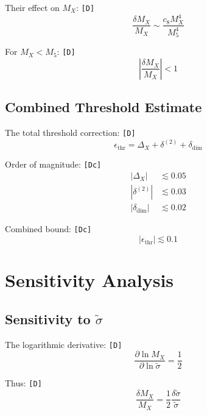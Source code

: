\documentclass[11pt,a4paper]{article}
\newcommand{\tagD}{\textcolor{green!50!black}{\texttt{[D]}}}
\newcommand{\tagDc}{\textcolor{blue!70!black}{\texttt{[Dc]}}}
\theoremstyle{definition}
\begin{document}
Their effect on $M_X$: \tagD{}
\begin{equation}
\label{eq:dim8-shift}
\frac{\delta M_X}{M_X} \sim \frac{c_8 M_X^4}{M_5^4}
\end{equation}

For $M_X < M_5$: \tagD{}
\begin{equation}
\label{eq:dim8-suppressed}
\left|\frac{\delta M_X}{M_X}\right| < 1
\end{equation}

\subsection{Combined Threshold Estimate}
\label{app:combined-threshold}

The total threshold correction: \tagD{}
\begin{equation}
\label{eq:total-threshold}
\epsilon_{\text{thr}} = \Delta_X + \delta^{(2)} + \delta_{\text{dim}}
\end{equation}

Order of magnitude: \tagDc{}
\begin{align}
\label{eq:threshold-order-1}
|\Delta_X| &\lesssim 0.05 \\
\label{eq:threshold-order-2}
|\delta^{(2)}| &\lesssim 0.03 \\
\label{eq:threshold-order-3}
|\delta_{\text{dim}}| &\lesssim 0.02
\end{align}

Combined bound: \tagDc{}
\begin{equation}
\label{eq:threshold-combined}
|\epsilon_{\text{thr}}| \lesssim 0.1
\end{equation}

\section{Sensitivity Analysis}
\label{app:sensitivity}

\subsection{Sensitivity to $\tilde{\sigma}$}
\label{app:sigma-sensitivity}

The logarithmic derivative: \tagD{}
\begin{equation}
\label{eq:log-derivative-sigma}
\frac{\partial \ln M_X}{\partial \ln \tilde{\sigma}} = \frac{1}{2}
\end{equation}

Thus: \tagD{}
\begin{equation}
\label{eq:sigma-sensitivity}
\frac{\delta M_X}{M_X} = \frac{1}{2} \frac{\delta \tilde{\sigma}}{\tilde{\sigma}}
\end{equation}
\end{document}

